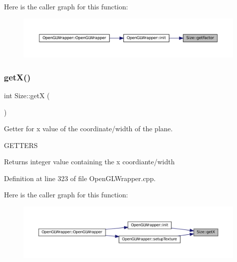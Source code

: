 Here is the caller graph for this function\+:\nopagebreak
\begin{figure}[H]
\begin{center}
\leavevmode
\includegraphics[width=350pt]{classSize_a1f0f20fa0d81274342165fce2355ab63_icgraph}
\end{center}
\end{figure}
\mbox{\label{classSize_ae9a207666c19954cae4b41174e1bb93d}} 
\subsubsection{\texorpdfstring{getX()}{getX()}}
{\footnotesize\ttfamily int Size\+::getX (\begin{DoxyParamCaption}{ }\end{DoxyParamCaption})}



Getter for x value of the coordinate/width of the plane. 

G\+E\+T\+T\+E\+RS\begin{DoxyReturn}{Returns}
integer value containing the x coordiante/width 
\end{DoxyReturn}


Definition at line 323 of file Open\+G\+L\+Wrapper.\+cpp.

Here is the caller graph for this function\+:\nopagebreak
\begin{figure}[H]
\begin{center}
\leavevmode
\includegraphics[width=350pt]{classSize_ae9a207666c19954cae4b41174e1bb93d_icgraph}
\end{center}
\end{figure}
\mbox{\label{classSize_aea85ae41eda5b85e61b72b3f9b1b4799}} 

